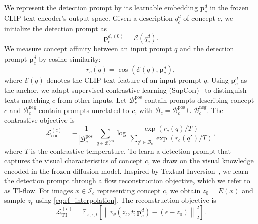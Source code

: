 We represent the detection prompt by its learnable embedding $\mathbf p_c^d$ in the frozen CLIP text encoder's output space.
Given a description $q_c^d$ of concept $c$, we initialize the detection prompt as
\begin{equation}
    \mathbf p_c^{d,(0)}=\mathcal E(q_c^d).
    \label{eq:detection_initialization}
\end{equation}
We measure concept affinity between an input prompt $q$ and the detection prompt $\mathbf p_c^d$ by cosine similarity:
\begin{equation}
    r_c(q)=\operatorname{cos}\!\left(\mathcal E(q),\mathbf p_c^d\right),
    \label{eq:detection_similarity}
\end{equation}
where $\mathcal E(q)$ denotes the CLIP text feature of an input prompt $q$.
Using $\mathbf p_c^d$ as the anchor, we adapt supervised contrastive learning (SupCon)~\cite{NEURIPS2020_d89a66c7} to distinguish texts matching $c$ from other inputs.
Let $\mathcal B_c^{\mathrm{pos}}$ contain prompts describing concept $c$ and $\mathcal B_c^{\mathrm{neg}}$ contain prompts unrelated to $c$, with $\mathcal B_c=\mathcal B_c^{\mathrm{pos}}\cup\mathcal B_c^{\mathrm{neg}}$.
The contrastive objective is
\begin{equation}
    \mathcal L_{\mathrm{con}}^{(c)}
    =-\frac1{|\mathcal B_c^{\mathrm{pos}}|}
    \sum_{q\in\mathcal B_c^{\mathrm{pos}}}
    \log\frac{\exp(r_c(q)/T)}
    {\sum_{q'\in\mathcal B_c}\exp(r_c(q')/T)},
    \label{eq:detection_supcon}
\end{equation}
where $T$ is the contrastive temperature.
To learn a detection prompt that captures the visual characteristics of concept $c$, we draw on the visual knowledge encoded in the frozen diffusion model.
Inspired by Textual Inversion~\cite{Gal_TextualInversion}, we learn the detection prompt through a flow reconstruction objective, which we refer to as TI-flow.
For images $x\in\mathcal I_c$ representing concept $c$, we obtain $z_0=E(x)$ and sample $z_t$ using \cref{eq:rf_interpolation}.
The reconstruction objective is
\begin{equation}
    \mathcal L_{\mathrm{TI}}^{(c)}
    =\mathbb E_{x,\epsilon,t}\!\left[
    \left\|v_\theta(z_t,t;\mathbf p_{c}^d)-(\epsilon-z_0)\right\|_2^2
    \right].
    \label{eq:detection_ti_flow}
\end{equation}

